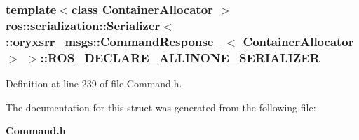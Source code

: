 \subsubsection[{\-R\-O\-S\-\_\-\-D\-E\-C\-L\-A\-R\-E\-\_\-\-A\-L\-L\-I\-N\-O\-N\-E\-\_\-\-S\-E\-R\-I\-A\-L\-I\-Z\-E\-R}]{\setlength{\rightskip}{0pt plus 5cm}template$<$class Container\-Allocator $>$ ros\-::serialization\-::\-Serializer$<$ \-::{\bf oryxsrr\-\_\-msgs\-::\-Command\-Response\-\_\-}$<$ \-Container\-Allocator $>$ $>$\-::{\bf \-R\-O\-S\-\_\-\-D\-E\-C\-L\-A\-R\-E\-\_\-\-A\-L\-L\-I\-N\-O\-N\-E\-\_\-\-S\-E\-R\-I\-A\-L\-I\-Z\-E\-R}}\label{structros_1_1serialization_1_1Serializer_3_01_1_1oryxsrr__msgs_1_1CommandResponse___3_01ContainerAllocator_01_4_01_4_a76997f3be01904f09f3e0368f5c6480b}


\-Definition at line 239 of file \-Command.\-h.



\-The documentation for this struct was generated from the following file\-:\begin{DoxyCompactItemize}
\item 
{\bf \-Command.\-h}\end{DoxyCompactItemize}
